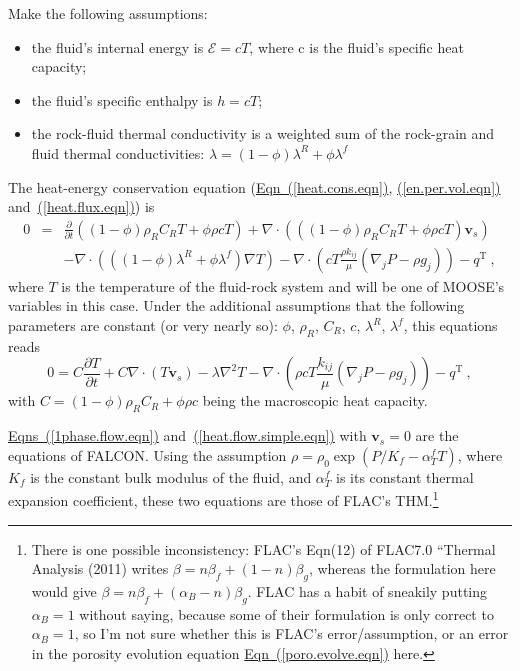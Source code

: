 \documentclass[12pt]{report}
\def\energydens{\mathcal{E}}
\begin{document}
Make the following assumptions:
\begin{itemize}
\item the fluid's internal energy is $\energydens = cT$, where c is
the fluid's specific heat capacity;
\item the fluid's specific enthalpy is $h = cT$;
\item the rock-fluid thermal conductivity is a weighted sum of the
  rock-grain and fluid thermal conductivities: $\lambda =
  (1-\phi)\lambda^{R} + \phi\lambda^{f}$
\end{itemize}
The heat-energy conservation equation
(\hyperref[heat.cons.eqn]{Eqn~(\ref*{heat.cons.eqn})},
\hyperref[en.per.vol.eqn]{(\ref*{en.per.vol.eqn})}
and~\hyperref[heat.flux.eqn]{(\ref*{heat.flux.eqn})}) is
\begin{eqnarray}
0 & = & \frac{\partial}{\partial t}\left( (1-\phi)\rho_{R}C_{R}T + \phi\rho cT
\right)
+ \nabla\cdot \left( ((1-\phi)\rho_{R}C_{R}T + \phi\rho cT){\mathbf{v}}_{s}
\right) \nonumber \\
&&  - \nabla\cdot \left( ((1-\phi)\lambda^{R} + \phi\lambda^{f})
\nabla T
\right) - \nabla\cdot \left( cT\frac{\rho
  k_{ij}}{\mu}(\nabla_{j} P - \rho g_{j}) \right) - q^{\mathrm{T}} \ ,
\end{eqnarray}
where $T$ is the temperature of the fluid-rock system and will be one
of MOOSE's variables in this case.  Under the additional assumptions
that the following parameters are constant (or very nearly so):
$\phi$, $\rho_{R}$, $C_{R}$, $c$, $\lambda^{R}$, $\lambda^{f}$, this
equations reads
\begin{equation}
0 = C\frac{\partial T}{\partial t} + C\nabla\cdot \left(T{\mathbf{v}}_{s}
\right) - \lambda\nabla^{2} T - \nabla\cdot \left( \rho c T\frac{
  k_{ij}}{\mu}(\nabla_{j} P - \rho g_{j}) \right) - q^{\mathrm{T}} \ ,
\label{heat.flow.simple.eqn}
\end{equation}
with $C = (1-\phi)\rho_{R}C_{R} + \phi\rho c$ being the macroscopic
heat capacity.

\hyperref[1phase.flow.eqn]{Eqns~(\ref*{1phase.flow.eqn})}
and~\hyperref[heat.flow.simple.eqn]{(\ref*{heat.flow.simple.eqn})}
with ${\mathbf{v}}_{s}=0$ are the equations of FALCON.  Using the
assumption $\rho = \rho_{0}\exp(P/K_{f} - \alpha_{T}^{f}T)$, where
$K_{f}$ is the constant bulk modulus of the fluid, and
$\alpha_{T}^{f}$ is its constant thermal expansion coefficient, these
two equations are those of FLAC's THM.\footnote{There is one possible
  inconsistency: FLAC's Eqn(12) of FLAC7.0 ``Thermal Analysis (2011)
  writes $\beta = n\beta_{f} + (1-n)\beta_{g}$, whereas the
  formulation here would give $\beta = n\beta_{f} +
  (\alpha_{B}-n)\beta_{g}$.  FLAC has a habit of sneakily putting
  $\alpha_{B}=1$ without saying, because some of their formulation is
  only correct to $\alpha_{B}=1$, so I'm not sure whether this is
  FLAC's error/assumption, or an error in the porosity evolution
  equation \hyperref[poro.evolve.eqn]{Eqn~(\ref*{poro.evolve.eqn})}
  here.}
\end{document}
